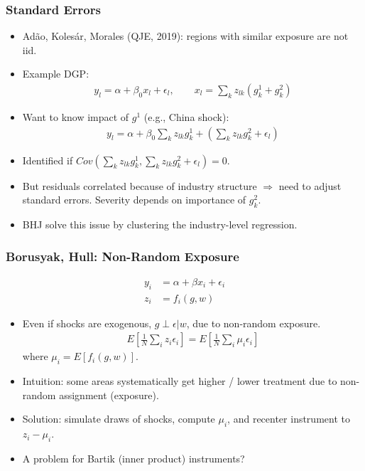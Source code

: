\documentclass[english,xcolor=svgnames]{beamer}
\begin{document}
\begin{frame}
\frametitle[alignment=center]{Standard Errors}
\begin{itemize}
	\item Ad\~{a}o, Koles\'{a}r, Morales (QJE, 2019): regions with similar exposure are not iid.
	\item Example DGP:
	\begin{align*}
		y_l = \alpha+\beta_0 x_l + \epsilon_l ,\qquad x_l = \sum_k z_{lk}(g_k^1 + g_k^2)
	\end{align*}
	\item Want to know impact of $g^1$ (e.g., China shock):
	\begin{align*}
		y_l = \alpha+\beta_0 \sum_k z_{lk}g_k^1 + (\sum_k z_{lk}g_k^2 + \epsilon_l)
	\end{align*}
	\item Identified if $Cov(\sum_k z_{lk}g_k^1,\sum_k z_{lk}g_k^2 + \epsilon_l) = 0$.
	\item But residuals correlated because of industry structure $\Rightarrow$ need to adjust standard errors. Severity depends on importance of $g_k^2$.
	\item BHJ solve this issue by clustering the industry-level regression.
\end{itemize}
\end{frame}

\begin{frame}
\frametitle[alignment=center]{Borusyak, Hull: Non-Random Exposure}
\begin{align*}
		y_i &= \alpha + \beta x_i + \epsilon_i \\
		z_i &= f_i(g,w)
	\end{align*}
\begin{itemize}
	\item Even if shocks are exogenous, $g \perp \epsilon | w$, due to non-random exposure.
\begin{align*}
	E\left[\frac{1}{N}\sum_i z_i \epsilon_i \right] = E\left[\frac{1}{N}\sum_i \mu_i \epsilon_i \right]
\end{align*}
where $\mu_i = E[f_i(g,w)]$.
\item Intuition: some areas systematically get higher / lower treatment due to non-random assignment (exposure).
\item Solution: simulate draws of shocks, compute $\mu_i$, and recenter instrument to $z_i-\mu_i$.
\item A problem for Bartik (inner product) instruments?
\end{itemize}
\end{frame}
\end{document}
